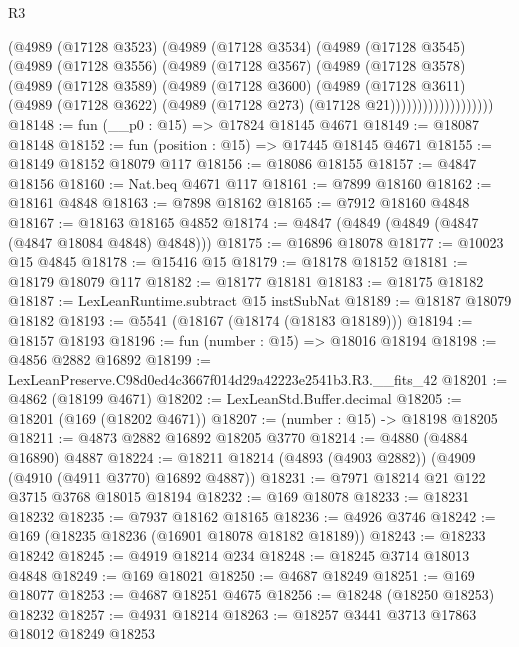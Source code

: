 \begin{lexlean}{R3}
\begin{coremodule}
                  (@4989
                    (@17128 @3523)
                    (@4989
                      (@17128 @3534)
                      (@4989
                        (@17128 @3545)
                        (@4989
                          (@17128 @3556)
                          (@4989
                            (@17128 @3567)
                            (@4989
                              (@17128 @3578)
                              (@4989
                                (@17128 @3589)
                                (@4989
                                  (@17128 @3600)
                                  (@4989
                                    (@17128 @3611)
                                    (@4989
                                      (@17128 @3622)
                                      (@4989 (@17128 @273) (@17128 @21)))))))))))))))))))
@18148 := fun (__p0 : @15) => @17824 @18145 @4671
@18149 := @18087 @18148
@18152 := fun (position : @15) => @17445 @18145 @4671
@18155 := @18149 @18152 @18079 @117
@18156 := @18086 @18155
@18157 := @4847 @18156
@18160 := Nat.beq @4671 @117
@18161 := @7899 @18160
@18162 := @18161 @4848
@18163 := @7898 @18162
@18165 := @7912 @18160 @4848
@18167 := @18163 @18165 @4852
@18174 := @4847 (@4849 (@4849 (@4847 (@4847 @18084 @4848) @4848)))
@18175 := @16896 @18078
@18177 := @10023 @15 @4845
@18178 := @15416 @15
@18179 := @18178 @18152
@18181 := @18179 @18079 @117
@18182 := @18177 @18181
@18183 := @18175 @18182
@18187 := LexLeanRuntime.subtract @15 instSubNat
@18189 := @18187 @18079 @18182
@18193 := @5541 (@18167 (@18174 (@18183 @18189)))
@18194 := @18157 @18193
@18196 := fun (number : @15) => @18016 @18194
@18198 := @4856 @2882 @16892
@18199 := LexLeanPreserve.C98d0ed4c3667f014d29a42223e2541b3.R3.__fits_42
@18201 := @4862 (@18199 @4671)
@18202 := LexLeanStd.Buffer.decimal
@18205 := @18201 (@169 (@18202 @4671))
@18207 := (number : @15) -> @18198 @18205
@18211 := @4873 @2882 @16892 @18205 @3770
@18214 := @4880 (@4884 @16890) @4887
@18224 := @18211 @18214 (@4893 (@4903 @2882)) (@4909 (@4910 (@4911 @3770) @16892 @4887))
@18231 := @7971 @18214 @21 @122 @3715 @3768 @18015 @18194
@18232 := @169 @18078
@18233 := @18231 @18232
@18235 := @7937 @18162 @18165
@18236 := @4926 @3746
@18242 := @169 (@18235 @18236 (@16901 @18078 @18182 @18189))
@18243 := @18233 @18242
@18245 := @4919 @18214 @234
@18248 := @18245 @3714 @18013 @4848
@18249 := @169 @18021
@18250 := @4687 @18249
@18251 := @169 @18077
@18253 := @4687 @18251 @4675
@18256 := @18248 (@18250 @18253) @18232
@18257 := @4931 @18214
@18263 := @18257 @3441 @3713 @17863 @18012 @18249 @18253

\end{coremodule}
\end{lexlean}
